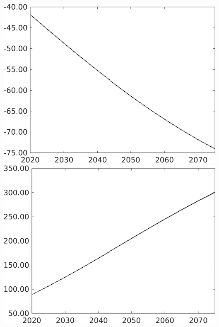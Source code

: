 \documentclass[12pt]{article}
\begin{document}
\begin{figure}[h!!]
\begin{minipage}[]{0.32\textwidth}
\end{minipage}	
\begin{minipage}[]{0.32\textwidth}
	\includegraphics[width=1\textwidth]{../../codding_model/own_basedOnFried/optimalPol_010922_revision/figures/all_13Sept22/PerdifNoTauf_Equlab_regime0_CompTaul_wsf_spillover0_nsk0_xgr0_knspil1_sep1_LFlimit0_emsbase0_countec0_GovRev0_etaa0.79_lgd0.png}
\end{minipage}	
\begin{minipage}[]{0.32\textwidth}
	\includegraphics[width=1\textwidth]{../../codding_model/own_basedOnFried/optimalPol_010922_revision/figures/all_13Sept22/PerdifNoTauf_Equlab_regime0_CompTaul_wsg_spillover0_nsk0_xgr0_knspil1_sep1_LFlimit0_emsbase0_countec0_GovRev0_etaa0.79_lgd0.png}
\end{minipage}	
\end{figure}
\end{document}
